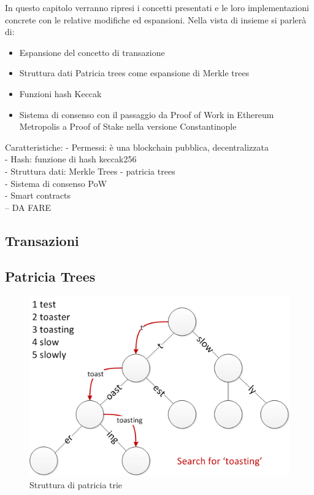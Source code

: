 In questo capitolo verranno ripresi i concetti presentati e le loro implementazioni concrete con le relative modifiche ed espansioni. Nella vista di insieme si parlerà di:

\begin{itemize}
\item Espansione del concetto di transazione
\item Struttura dati Patricia trees come espansione di Merkle trees
\item Funzioni hash Keccak
\item Sistema di consenso con il passaggio da Proof of Work in Ethereum Metropolis  a Proof of Stake nella versione Constantinople
\end{itemize}

Caratteristiche: 
- Permessi: è una blockchain pubblica, decentralizzata\\
- Hash: funzione di hash keccak256\\
- Struttura dati: Merkle Trees - patricia trees\\
- Sistema di consenso PoW\\
- Smart contracts\\
-- DA FARE\\

\subsection{Transazioni}

\subsection{Patricia Trees}

\begin{figure}[H]
\centering
\includegraphics[width=1\textwidth]{immagini/patricia_trie.png}
\caption{Struttura di patricia trie}
\label{fig:mesh6}
\end{figure}

